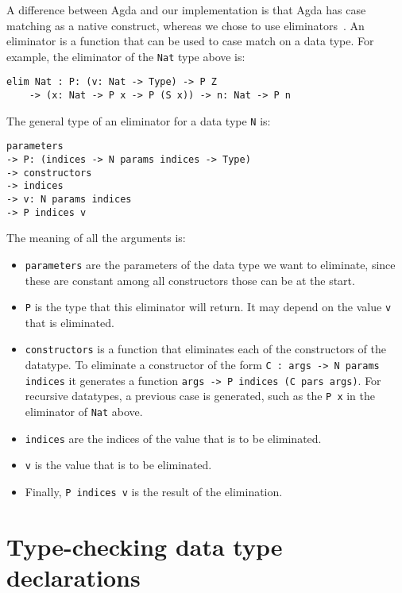 A difference between Agda and our implementation is that Agda has case matching as a native construct, whereas we chose to use eliminators~\cite{eliminators}. An eliminator is a function that can be used to case match on a data type. For example, the eliminator of the \verb|Nat| type above is:
\begin{lstlisting}
elim Nat : P: (v: Nat -> Type) -> P Z 
	-> (x: Nat -> P x -> P (S x)) -> n: Nat -> P n
\end{lstlisting}

The general type of an eliminator for a data type \verb|N| is:
\begin{lstlisting}
parameters 
-> P: (indices -> N params indices -> Type) 
-> constructors
-> indices
-> v: N params indices
-> P indices v
\end{lstlisting}
The meaning of all the arguments is:
\begin{itemize}
	\item \verb|parameters| are the parameters of the data type we want to eliminate, since these are constant among all constructors those can be at the start.
	\item \verb|P| is the type that this eliminator will return. It may depend on the value \verb|v| that is eliminated.
	\item \verb|constructors| is a function that eliminates each of the constructors of the datatype. To eliminate a constructor of the form \verb|C : args -> N params indices| it generates a function \verb|args -> P indices (C pars args)|. For recursive datatypes, a previous case is generated, such as the \verb|P x| in the eliminator of \verb|Nat| above.
	\item \verb|indices| are the indices of the value that is to be eliminated.
	\item \verb|v| is the value that is to be eliminated.
	\item Finally, \verb|P indices v| is the result of the elimination.
\end{itemize}

\section{Type-checking data type declarations}
\label{ch:datatypes:typechecking}

